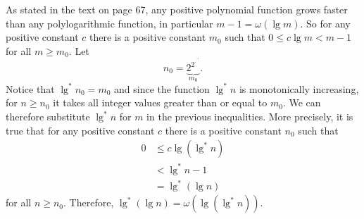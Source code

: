 \starred
As stated in the text on page 67, any positive polynomial function grows faster than any polylogarithmic function, in particular $m-1=\omega(\lg m)$.
So for any positive constant $c$ there is a positive constant $m_0$ such that $0\le c\lg m<m-1$ for all $m\ge m_0$.
Let
\[
    n_0 = \underbrace{2^{2^{\cdot^{\cdot^{\cdot^{2}}}}}}_{m_0}.
\]
Notice that $\lg^*n_0=m_0$ and since the function $\lg^*n$ is monotonically increasing, for $n\ge n_0$ it takes all integer values greater than or equal to $m_0$.
We can therefore substitute $\lg^*n$ for $m$ in the previous inequalities.
More precisely, it is true that for any positive constant $c$ there is a positive constant $n_0$ such that
\begin{align*}
    0 &\le c\lg(\lg^*n) \\
    &< \lg^*n-1 \\
    &= \lg^*(\lg n)
\end{align*}
for all $n\ge n_0$.
Therefore, $\lg^*(\lg n)=\omega(\lg(\lg^*n))$.
